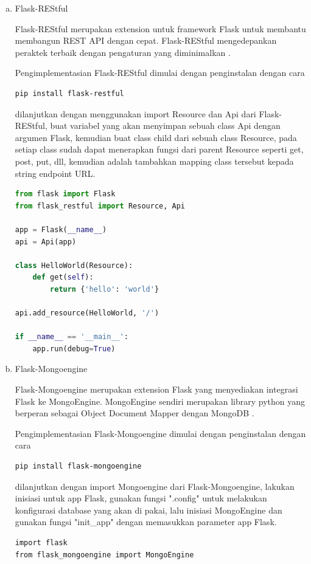 	\begin{enumerate}[a.]
		\item{Flask-REStful}
		
		Flask-REStful merupakan extension untuk framework Flask untuk membantu membangun REST API dengan cepat. Flask-REStful mengedepankan peraktek terbaik dengan pengaturan yang diminimalkan \citep{kevinburke2020flaskrestful}.
		
		Pengimplementasian Flask-REStful dimulai dengan penginstalan dengan cara
\begin{lstlisting}
pip install flask-restful
\end{lstlisting}
		dilanjutkan dengan menggunakan import Resource dan Api dari Flask-REStful, buat variabel yang akan menyimpan sebuah class Api dengan argumen Flask, kemudian buat class child dari sebuah class Resource, pada setiap class sudah dapat menerapkan fungsi dari parent Resource seperti get, post, put, dll, kemudian adalah tambahkan mapping class tersebut kepada string endpoint URL.
\begin{lstlisting}[language=Python, caption=Python example]
from flask import Flask
from flask_restful import Resource, Api

app = Flask(__name__)
api = Api(app)

class HelloWorld(Resource):
    def get(self):
        return {'hello': 'world'}

api.add_resource(HelloWorld, '/')

if __name__ == '__main__':
    app.run(debug=True)
\end{lstlisting}

		
		\item{Flask-Mongoengine}
		
		Flask-Mongoengine merupakan extension Flask yang menyediakan integrasi Flask ke MongoEngine. MongoEngine sendiri merupakan library python yang berperan sebagai Object Document Mapper dengan MongoDB \citep{streetlife2020flaskmongoenginedocumentation}.
		
		Pengimplementasian Flask-Mongoengine dimulai dengan penginstalan dengan cara 
\begin{lstlisting}
pip install flask-mongoengine
\end{lstlisting}
		dilanjutkan dengan import Mongoengine dari Flask-Mongoengine, lakukan inisiasi untuk app Flask, gunakan fungsi ".config" untuk melakukan konfigurasi database yang akan di pakai, lalu inisiasi MongoEngine dan gunakan fungsi "init\_app" dengan memasukkan parameter app Flask.
\begin{lstlisting}
import flask
from flask_mongoengine import MongoEngine
		


\end{lstlisting}
\end{enumerate}

